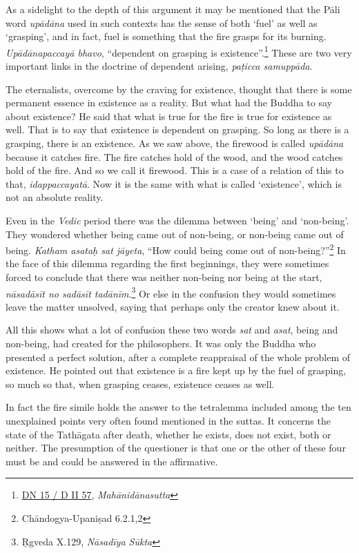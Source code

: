 As a sidelight to the depth of this argument it may be mentioned that the Pāli word \emph{upādāna} used in such contexts has the sense of both `fuel' as well as `grasping', and in fact, fuel is something that the fire grasps for its burning. \emph{Upādānapaccayā bhavo}, ``dependent on grasping is existence''.\footnote{\href{https://suttacentral.net/dn15/pli/ms}{DN 15 / D II 57}, \emph{Mahānidānasutta}} These are two very important links in the doctrine of dependent arising, \emph{paṭicca samuppāda}.

The eternalists, overcome by the craving for existence, thought that there is some permanent essence in existence as a reality. But what had the Buddha to say about existence? He said that what is true for the fire is true for existence as well. That is to say that existence is dependent on grasping. So long as there is a grasping, there is an existence. As we saw above, the firewood is called \emph{upādāna} because it catches fire. The fire catches hold of the wood, and the wood catches hold of the fire. And so we call it firewood. This is a case of a relation of this to that, \emph{idappaccayatā}. Now it is the same with what is called `existence', which is not an absolute reality.

Even in the \emph{Vedic} period there was the dilemma between `being' and `non-being'. They wondered whether being came out of non-being, or non-being came out of being. \emph{Katham asataḥ sat jāyeta}, ``How could being come out of non-being?''\footnote{Chāndogya-Upaniṣad 6.2.1,2} In the face of this dilemma regarding the first beginnings, they were sometimes forced to conclude that there was neither non-being nor being at the start, \emph{nāsadāsīt no sadāsīt tadānīm}.\footnote{Ṛgveda X.129, \emph{Nāsadīya Sūkta}} Or else in the confusion they would sometimes leave the matter unsolved, saying that perhaps only the creator knew about it.

All this shows what a lot of confusion these two words \emph{sat} and \emph{asat}, being and non-being, had created for the philosophers. It was only the Buddha who presented a perfect solution, after a complete reappraisal of the whole problem of existence. He pointed out that existence is a fire kept up by the fuel of grasping, so much so that, when grasping ceases, existence ceases as well.

In fact the fire simile holds the answer to the tetralemma included among the ten unexplained points very often found mentioned in the suttas. It concerns the state of the Tathāgata after death, whether he exists, does not exist, both or neither. The presumption of the questioner is that one or the other of these four must be and could be answered in the affirmative.

